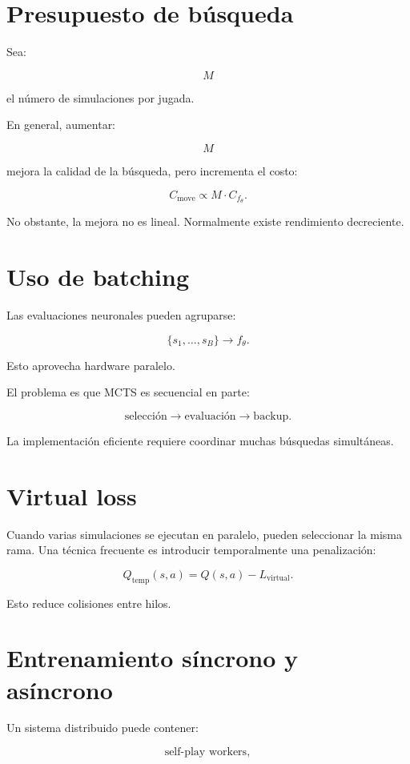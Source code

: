 \documentclass[11pt,a4paper]{article}
\begin{document}
\section{Presupuesto de búsqueda}

Sea:

\[
M
\]

el número de simulaciones por jugada.

En general, aumentar:

\[
M
\]

mejora la calidad de la búsqueda, pero incrementa el costo:

\[
C_{\mathrm{move}}
\propto
M
\cdot
C_{f_\theta}.
\]

No obstante, la mejora no es lineal. Normalmente existe rendimiento decreciente.

\section{Uso de batching}

Las evaluaciones neuronales pueden agruparse:

\[
\{s_1,\ldots,s_B\}
\rightarrow
f_\theta.
\]

Esto aprovecha hardware paralelo.

El problema es que MCTS es secuencial en parte:

\[
\text{selección}
\rightarrow
\text{evaluación}
\rightarrow
\text{backup}.
\]

La implementación eficiente requiere coordinar muchas búsquedas simultáneas.

\section{Virtual loss}

Cuando varias simulaciones se ejecutan en paralelo, pueden seleccionar la misma rama. Una técnica frecuente es introducir temporalmente una penalización:

\[
Q_{\mathrm{temp}}(s,a)
=
Q(s,a)-L_{\mathrm{virtual}}.
\]

Esto reduce colisiones entre hilos.

\section{Entrenamiento síncrono y asíncrono}

Un sistema distribuido puede contener:

\[
\text{self-play workers},
\]
\end{document}
